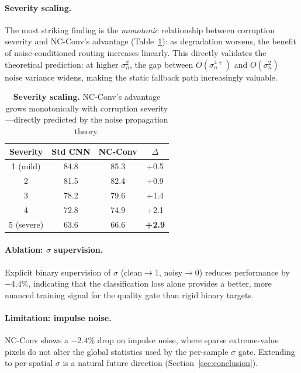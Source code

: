 \documentclass{bmvc2k}
\begin{document}
\paragraph{Severity scaling.}
The most striking finding is the \emph{monotonic} relationship between corruption severity and NC-Conv's advantage (Table~\ref{tab:severity}): as degradation worsens, the benefit of noise-conditioned routing increases linearly.
This directly validates the theoretical prediction: at higher $\sigma_n^2$, the gap between $O(\sigma_n^{4+})$ and $O(\sigma_n^2)$ noise variance widens, making the static fallback path increasingly valuable.

\begin{table}[t]
\centering
\caption{\textbf{Severity scaling.} NC-Conv's advantage grows monotonically with corruption severity---directly predicted by the noise propagation theory.}
\label{tab:severity}
\small
\begin{tabular}{@{}cccc@{}}
\toprule
\textbf{Severity} & \textbf{Std CNN} & \textbf{NC-Conv} & $\Delta$ \\
\midrule
1 (mild)   & 84.8 & 85.3 & +0.5 \\
2          & 81.5 & 82.4 & +0.9 \\
3          & 78.2 & 79.6 & +1.4 \\
4          & 72.8 & 74.9 & +2.1 \\
5 (severe) & 63.6 & 66.6 & \textbf{+2.9} \\
\bottomrule
\end{tabular}
\end{table}

\paragraph{Ablation: $\sigma$ supervision.}
Explicit binary supervision of $\sigma$ (clean$\to$1, noisy$\to$0) reduces performance by $-4.4\%$, indicating that the classification loss alone provides a better, more nuanced training signal for the quality gate than rigid binary targets.

\paragraph{Limitation: impulse noise.}
NC-Conv shows a $-2.4\%$ drop on impulse noise, where sparse extreme-value pixels do not alter the global statistics used by the per-sample $\sigma$ gate.
Extending to per-spatial $\sigma$ is a natural future direction (Section~\ref{sec:conclusion}).
\end{document}
